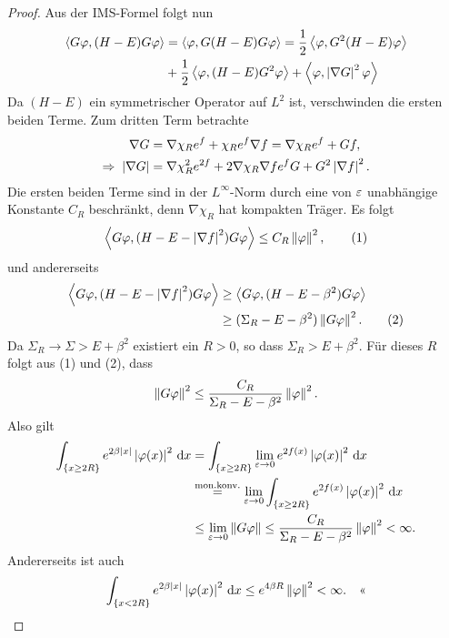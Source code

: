 \begin{proof}
Aus der IMS-Formel folgt nun
\begin{align*}
\left\langle G\varphi,(H-E)G\varphi\right\rangle &= \left\langle\varphi, G(H-E)G\varphi\right\rangle
= \frac{1}{2}\left\langle\varphi,G^2(H-E)\varphi\right\rangle \\ &+ \frac{1}{2}\left\langle\varphi,(H-E)G^2\varphi\right\rangle
+ \left\langle\varphi,\left|\nabla G\right|^2\varphi\right\rangle
\end{align*}
Da $(H-E)$ ein symmetrischer Operator auf $L^2$ ist, verschwinden die ersten
beiden Terme. Zum dritten Term betrachte
\begin{align*}
\nabla G &= \nabla \chi_R e^f + \chi_R e^f \nabla f 
=  \nabla \chi_R e^f + G f,\\
\Rightarrow\;\left|\nabla G\right| &= \nabla \chi_R^2 e^{2f} + 2\nabla \chi_R \nabla f
e^f G + G^2\left|\nabla f\right|^2.
\end{align*}
Die ersten beiden Terme sind in der $L^\infty$-Norm durch eine von
$\varepsilon$ unabhängige Konstante $C_R$  beschränkt, denn $\nabla \chi_R$ hat
kompakten Träger. Es folgt
\begin{align*}
\left\langle G\varphi,(H-E-\left|\nabla f\right|^2)G\varphi\right\rangle \le C_R\left\|\varphi\right\|^2,\tag{1}
\end{align*}
und andererseits
\begin{align*}
\left\langle G\varphi,(H-E-\left|\nabla f\right|^2)G\varphi\right\rangle &\ge \left\langle G\varphi,(H-E-\beta^2)G\varphi\right\rangle
\\ &\ge (\Sigma_R-E-\beta^2)\left\|G\varphi\right\|^2.\tag{2}
\end{align*}
Da $\Sigma_R\to\Sigma> E+\beta^2$ existiert ein $R> 0$, so dass $\Sigma_R >
E+\beta^2$. Für dieses $R$ folgt aus (1) und (2), dass
\begin{align*}
\left\|G\varphi\right\|^2 \le \frac{C_R}{\Sigma_R-E-\beta^2} \left\|\varphi\right\|^2.
\end{align*}
Also gilt
\begin{align*}
\int_{\left\{ x\ge 2R \right\}} e^{2\beta\left|x\right|}\left|\varphi(x)\right|^2\,\mathrm{d} x
&=
\int_{\left\{ x\ge 2R \right\}} \lim\limits_{\varepsilon \to 0} e^{2f(x)}\left|\varphi(x)\right|^2\,\mathrm{d} x\\
&\overset{\text{mon.konv.}}{=}
\lim\limits_{\varepsilon \to 0}
\int_{\left\{ x\ge 2R \right\}}  e^{2f(x)}\left|\varphi(x)\right|^2\,\mathrm{d} x\\
&\le
\lim\limits_{\varepsilon\to 0}
\left\|G\varphi\right\|
\le
\frac{C_R}{\Sigma_R-E-\beta^2} \left\|\varphi\right\|^2
< \infty.
\end{align*}
Andererseits ist auch
\begin{align*}
\int_{\left\{ x< 2R \right\}} e^{2\beta\left|x\right|}\left|\varphi(x)\right|^2\,\mathrm{d} x
\le
e^{4\beta R}\left\|\varphi\right\|^2 < \infty.\quad\text{<<}
\end{align*}
\end{proof}

